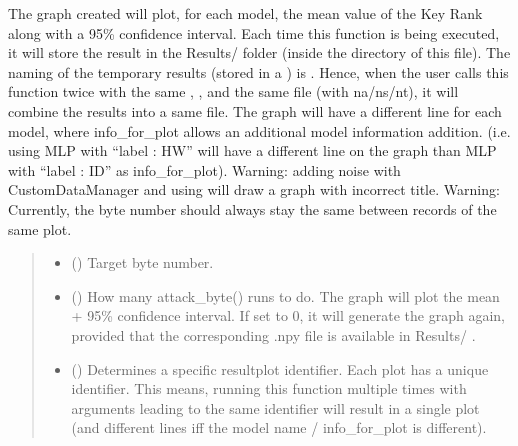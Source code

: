 \documentclass[letterpaper,10pt,english]{sphinxmanual}
\begin{document}
\begin{fulllineitems}
\begin{fulllineitems}
\sphinxAtStartPar
The graph created will plot, for each model, the mean value of the Key Rank along with
a 95\% confidence interval. Each time this function is being executed, it will store the result in the
Results/ folder (inside the directory of this file). The naming of the temporary results (stored in a ) is
.
Hence, when the user calls this function twice with the same , ,  and the same
file (with na/ns/nt), it will combine the results into a same file. The graph will have a different line
for each model, where info\_for\_plot allows an additional model information addition. (i.e. using MLP with
“label : HW” will have a different line on the graph than MLP with “label : ID” as info\_for\_plot).
Warning: adding noise with CustomDataManager and using  will draw a graph with incorrect title.
Warning: Currently, the byte number should always stay the same between records of the same plot.
\begin{quote}\begin{description}
\begin{itemize}
\item {} 
\sphinxAtStartPar
{} (\sphinxstyleliteralemphasis{\sphinxupquote{, }}) \textendash{} Target byte number.

\item {} 
\sphinxAtStartPar
{} (\sphinxstyleliteralemphasis{\sphinxupquote{, }}) \textendash{} How many attack\_byte() runs to do. The graph will plot the mean + 95\% confidence interval.
If set to 0, it will generate the graph again, provided that the corresponding .npy file
is available in Results/ .

\item {} 
\sphinxAtStartPar
{} (\sphinxstyleliteralemphasis{\sphinxupquote{, }}) \textendash{} Determines a specific result\sphinxhyphen{}plot identifier. Each plot has a unique identifier. This means,
running this function multiple times with arguments leading to the same identifier will
result in a single plot (and different lines iff the model name / info\_for\_plot is different).


\end{itemize}
\end{description}
\end{quote}
\end{fulllineitems}
\end{fulllineitems}
\end{document}
